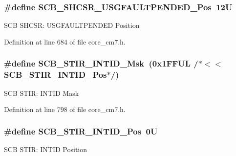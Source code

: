 \subsubsection[{\texorpdfstring{S\+C\+B\+\_\+\+S\+H\+C\+S\+R\+\_\+\+U\+S\+G\+F\+A\+U\+L\+T\+P\+E\+N\+D\+E\+D\+\_\+\+Pos}{SCB_SHCSR_USGFAULTPENDED_Pos}}]{\setlength{\rightskip}{0pt plus 5cm}\#define S\+C\+B\+\_\+\+S\+H\+C\+S\+R\+\_\+\+U\+S\+G\+F\+A\+U\+L\+T\+P\+E\+N\+D\+E\+D\+\_\+\+Pos~12U}\hypertarget{group___c_m_s_i_s___s_c_b_ga3cf03acf1fdc2edc3b047ddd47ebbf87}{}\label{group___c_m_s_i_s___s_c_b_ga3cf03acf1fdc2edc3b047ddd47ebbf87}
S\+CB S\+H\+C\+SR\+: U\+S\+G\+F\+A\+U\+L\+T\+P\+E\+N\+D\+ED Position 

Definition at line 684 of file core\+\_\+cm7.\+h.

\subsubsection[{\texorpdfstring{S\+C\+B\+\_\+\+S\+T\+I\+R\+\_\+\+I\+N\+T\+I\+D\+\_\+\+Msk}{SCB_STIR_INTID_Msk}}]{\setlength{\rightskip}{0pt plus 5cm}\#define S\+C\+B\+\_\+\+S\+T\+I\+R\+\_\+\+I\+N\+T\+I\+D\+\_\+\+Msk~(0x1\+F\+F\+U\+L /$\ast$$<$$<$ S\+C\+B\+\_\+\+S\+T\+I\+R\+\_\+\+I\+N\+T\+I\+D\+\_\+\+Pos$\ast$/)}\hypertarget{group___c_m_s_i_s___s_c_b_ga7b67f900eb9c63b04e67f8fa6ddcd8ed}{}\label{group___c_m_s_i_s___s_c_b_ga7b67f900eb9c63b04e67f8fa6ddcd8ed}
S\+CB S\+T\+IR\+: I\+N\+T\+ID Mask 

Definition at line 798 of file core\+\_\+cm7.\+h.

\subsubsection[{\texorpdfstring{S\+C\+B\+\_\+\+S\+T\+I\+R\+\_\+\+I\+N\+T\+I\+D\+\_\+\+Pos}{SCB_STIR_INTID_Pos}}]{\setlength{\rightskip}{0pt plus 5cm}\#define S\+C\+B\+\_\+\+S\+T\+I\+R\+\_\+\+I\+N\+T\+I\+D\+\_\+\+Pos~0U}\hypertarget{group___c_m_s_i_s___s_c_b_gaeb4a916d84d967c1bab8e88800a28984}{}\label{group___c_m_s_i_s___s_c_b_gaeb4a916d84d967c1bab8e88800a28984}
S\+CB S\+T\+IR\+: I\+N\+T\+ID Position 

